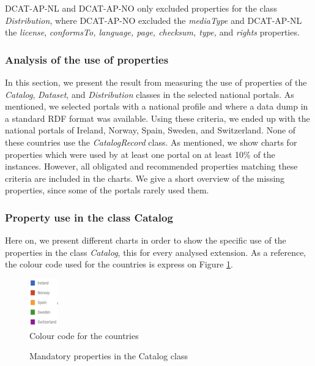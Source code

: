 \documentclass[<options>]{elsarticle}
\begin{document}
DCAT-AP-NL and DCAT-AP-NO only excluded properties for the class \textit{Distribution}, where DCAT-AP-NO excluded the \textit{mediaType} and DCAT-AP-NL the \textit{license}, \textit{conformsTo, language, page, checksum, type, } and \textit{rights} properties.

\subsubsection{Analysis of the use of properties}
In this section, we present the result from measuring the use of properties of the \textit{Catalog}, \textit{Dataset}, and \textit{Distribution} classes in the selected national portals. As mentioned, we selected portals with a national profile and where a data dump in a standard RDF format was available. Using these criteria, we ended up with the national portals of Ireland, Norway, Spain, Sweden, and Switzerland. None of these countries use the \textit{CatalogRecord} class. As mentioned, we show charts for properties which were used by at least one portal on at least 10\% of the instances. However, all obligated and recommended properties matching these criteria are included in the charts. We give a short overview of the missing properties, since some of the portals rarely used them.

\subsubsection*{Property use in the class Catalog}
Here on, we present different charts in order to show the specific use of the properties in the class \textit{Catalog}, this for every analysed extension.
As a reference, the colour code used for the countries is express on Figure \ref{ColourCode}.

\begin{figure}[H]
\includegraphics{replace3.png}
\caption{Colour code for the countries}
\label{ColourCode}
\end{figure}

\begin{figure}[H]
\caption{Mandatory properties in the Catalog class}
\label{MandatoryCatalog}
\end{figure}
\end{document}
